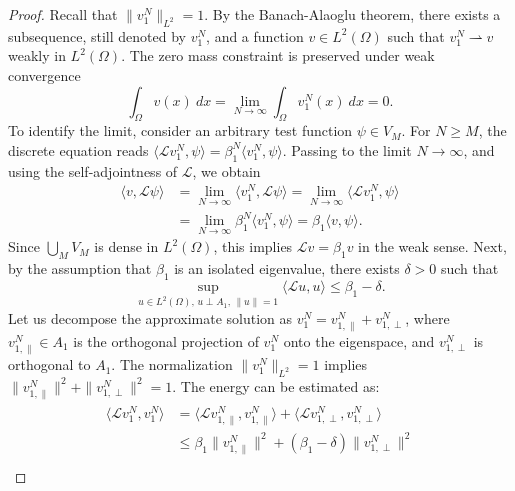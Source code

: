 \documentclass[11pt, a4paper]{article}
\theoremstyle{break}
\theoremstyle{break}
\theoremstyle{break}
\theoremstyle{break}
\theoremstyle{break}
\theoremstyle{break}
\theoremstyle{break}
\theoremstyle{break}
\theoremstyle{break}
\begin{document}
\begin{proof}
    Recall that $\|v_1^N\|_{L^2} = 1$. By the Banach-Alaoglu theorem, there exists a subsequence, still denoted by $v_1^N$, and a function $v \in L^2(\Omega)$ such that $v_1^N \rightharpoonup v$ weakly in $L^2(\Omega)$. The zero mass constraint is preserved under weak convergence
    \begin{equation}
        \int_\Omega v(x) \:dx = \lim_{N \to \infty} \int_\Omega v_1^N(x) \:dx = 0.
    \end{equation}
    To identify the limit, consider an arbitrary test function $\psi \in V_M$. For $N \geq M$, the discrete equation reads $\langle \mathcal{L} v_1^N, \psi \rangle = \beta_1^N \langle v_1^N, \psi \rangle$. Passing to the limit $N \to \infty$, and using the self-adjointness of $\mathcal{L}$, we obtain
    \begin{align}
        \langle v, \mathcal{L} \psi \rangle &= \lim_{N \to \infty} \langle v_1^N, \mathcal{L} \psi \rangle = \lim_{N \to \infty} \langle \mathcal{L} v_1^N, \psi \rangle \\
        &= \lim_{N \to \infty} \beta_1^N \langle v_1^N, \psi \rangle = \beta_1 \langle v, \psi \rangle.
    \end{align}
    Since $\bigcup_{M} V_M$ is dense in $L^2(\Omega)$, this implies $\mathcal{L} v = \beta_1 v$ in the weak sense.
    Next, by the assumption that $\beta_1$ is an isolated eigenvalue, there exists $\delta > 0$ such that
    \begin{equation}
        \sup_{u \in L^2(\Omega), \, u \perp A_1, \, \|u\|=1} \langle \mathcal{L} u, u \rangle \leq \beta_1 - \delta.
    \end{equation}
    Let us decompose the approximate solution as $v_1^N = v_{1, \parallel}^{N} + v_{1, \perp}^{N}$, where $v_{1, \parallel}^{N} \in A_1$ is the orthogonal projection of $v_1^N$ onto the eigenspace, and $v_{1, \perp}^{N}$ is orthogonal to $A_1$. The normalization $\|v_1^N\|_{L^2}=1$ implies $\|v_{1, \parallel}^{N}\|^2 + \|v_{1, \perp}^{N}\|^2 = 1$. The energy can be estimated as:
    \begin{align}
        \begin{split}
            \langle \mathcal{L} v_1^N, v_1^N \rangle &= \langle \mathcal{L} v_{1, \parallel}^{N}, v_{1, \parallel}^{N} \rangle + \langle \mathcal{L} v_{1, \perp}^{N}, v_{1, \perp}^{N} \rangle \\
            &\leq \beta_1 \|v_{1, \parallel}^{N}\|^2 + (\beta_1 - \delta) \|v_{1, \perp}^{N}\|^2 \\

\end{split}
\end{align}
\end{proof}
\end{document}
